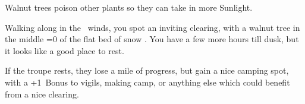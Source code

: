 

Walnut trees poison other plants so they can take in more Sunlight.

\begin{boxtext}
  Walking along in the \showTemperature\ winds, you spot an inviting clearing, with a walnut tree in the middle%
  \ifnum\value{temperature}=0%
    \space of the flat bed of snow%
  \fi.
  You have a few more hours till dusk, but it looks like a good place to rest.
\end{boxtext}

If the troupe rests, they lose a mile of progress, but gain a nice camping spot, with a +1~Bonus to \glspl{vigil}, making camp, or anything else which could benefit from a nice clearing.

